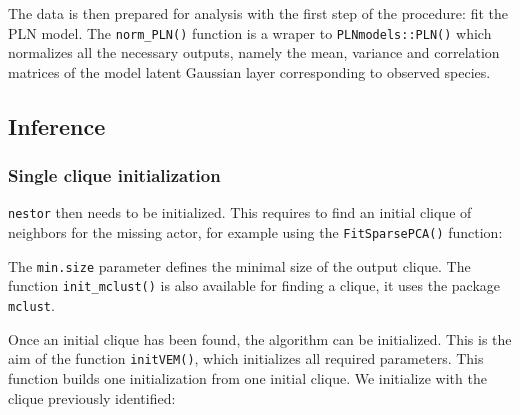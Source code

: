 The data is then prepared for analysis with the first step of the
procedure: fit the PLN model. The \texttt{norm\_PLN()} function is a
wraper to \texttt{PLNmodels::PLN()} which normalizes all the necessary
outputs, namely the mean, variance and correlation matrices of the model
latent Gaussian layer corresponding to observed species.

\begin{Shaded}
\begin{Highlighting}[]
\OperatorTok{\$}
\OperatorTok{\$}
\OperatorTok{\$}
\OperatorTok{\$}
\end{Highlighting}
\end{Shaded}

\subsection{Inference}\label{inference}

\subsubsection{Single clique
initialization}\label{single-clique-initialization}

\texttt{nestor} then needs to be initialized. This requires to find an
initial clique of neighbors for the missing actor, for example using the
\texttt{FitSparsePCA()} function:

\begin{Shaded}
\begin{Highlighting}[]
\StringTok{ }\OperatorTok{\$}\NormalTok{, } \NormalTok{)}\OperatorTok{\$}
\CommentTok{#> [[1]]}
\end{Highlighting}
\end{Shaded}

The \texttt{min.size} parameter defines the minimal size of the output
clique. The function \texttt{init\_mclust()} is also available for
finding a clique, it uses the package \texttt{mclust}.

Once an initial clique has been found, the algorithm can be initialized.
This is the aim of the function \texttt{initVEM()}, which initializes
all required parameters. This function builds one initialization from
one initial clique. We initialize with the clique previously identified:

